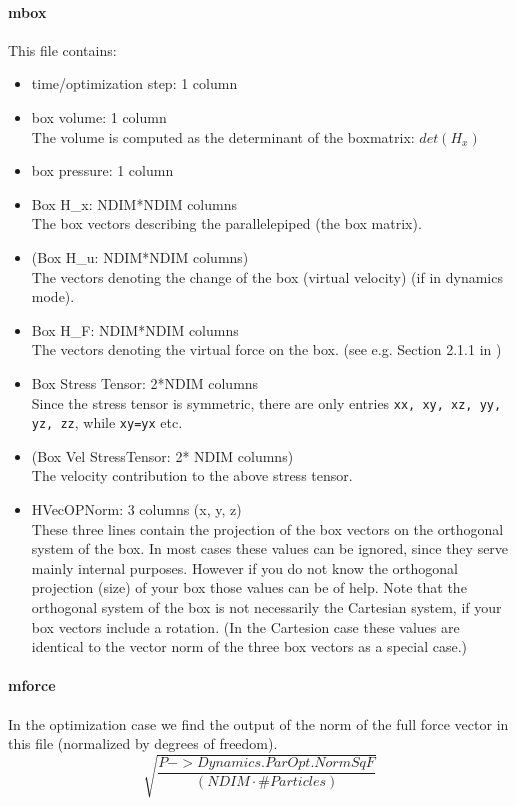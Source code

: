 \paragraph{mbox}
 This file contains:
\begin{itemize}
  \item time/optimization step: 1 column
  \item box volume: 1 column\\
    The volume is computed as the determinant of the boxmatrix: $det(H_x)$
  \item box pressure: 1 column
  \item Box H\_x: NDIM*NDIM columns \\
    The box vectors describing the parallelepiped (the box matrix).
  \item (Box H\_u: NDIM*NDIM columns)\\
    The vectors denoting the change of the box (virtual velocity) (if in dynamics mode).
  \item Box H\_F: NDIM*NDIM columns\\
    The vectors denoting the virtual force on the box.
    (see e.g. Section 2.1.1 in \cite{Griebel.Hamaekers:2005b})
  \item Box Stress Tensor: 2*NDIM columns\\
    Since the stress tensor is symmetric, there are only entries {\tt xx, xy, xz, yy, yz, zz}, while {\tt xy=yx} etc.
  \item (Box Vel StressTensor: 2* NDIM columns)\\
    The velocity contribution to the above stress tensor.
  \item HVecOPNorm: 3 columns (x, y, z)\\
    These three lines contain the projection of the box vectors on the orthogonal system of the box.
   In most cases these values can be ignored, since they serve mainly internal purposes. However if
   you do not know the orthogonal projection (size) of your box those values can be of help.
   Note that the orthogonal system of the box is not necessarily the Cartesian system, if your box
   vectors include a rotation. (In the Cartesion case these values are identical to the vector norm of the three box vectors as a special case.)
\end{itemize}







\paragraph{mforce}
In the optimization case we find the output of the norm of the full force vector in this file (normalized by degrees of freedom).
\begin{equation*}
\sqrt{\frac{P->Dynamics.ParOpt.NormSqF}{\left(NDIM \cdot \#Particles\right)}}
\end{equation*}

